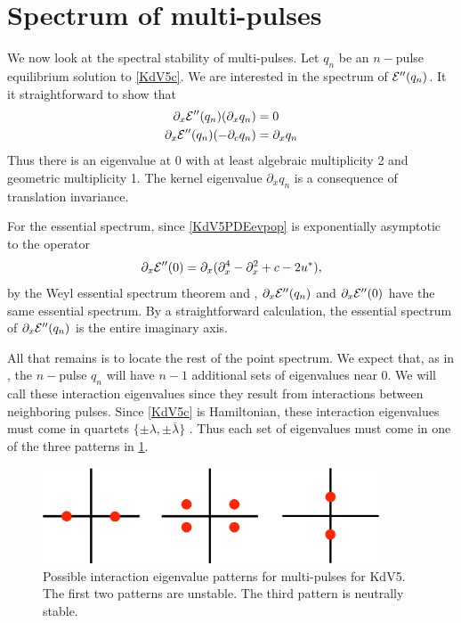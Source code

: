 \documentclass[thesis.tex]{subfiles}
\begin{document}
\section{Spectrum of multi-pulses}

We now look at the spectral stability of multi-pulses. Let $q_n$ be an $n-$pulse equilibrium solution to \cref{KdV5c}. We are interested in the spectrum of $\mathcal{E}''(q_n)$. It it straightforward to show that 
\begin{align*}
\partial_x \mathcal{E}''(q_n) (\partial_x q_n) &= 0 \\
\partial_x \mathcal{E}''(q_n) (-\partial_c q_n) &= \partial_x q_n
\end{align*}
Thus there is an eigenvalue at 0 with at least algebraic multiplicity 2 and geometric multiplicity 1. The kernel eigenvalue $\partial_x q_n$ is a consequence of translation invariance.

For the essential spectrum, since \cref{KdV5PDEevpop} is exponentially asymptotic to the operator 
\[
\partial_x \mathcal{E}''(0) = 
\partial_x(\partial_x^4 - \partial_x^2 + c - 2 u^*),
\]
by the Weyl essential spectrum theorem \cite[Theorem 2.2.6]{Kapitula2013} and \cite[Theorem 3.1.11]{Kapitula2013}, $\partial_x \mathcal{E}''(q_n)$ and $\partial_x \mathcal{E}''(0)$ have the same essential spectrum. By a straightforward calculation, the essential spectrum of $\partial_x \mathcal{E}''(q_n)$ is the entire imaginary axis.

All that remains is to locate the rest of the point spectrum. We expect that, as in \cite{Sandstede1998}, the $n-$pulse $q_n$ will have $n-1$ additional sets of eigenvalues near 0. We will call these interaction eigenvalues since they result from interactions between neighboring pulses. Since \cref{KdV5c} is Hamiltonian, these interaction eigenvalues must come in quartets $\{ \pm \lambda, \pm \overline{\lambda}\}$ \cite[Proposition 5.1.2]{Kapitula2013}. Thus each set of eigenvalues must come in one of the three patterns in \cref{fig:kdv5inteigpattern}.

\begin{figure}[H]
\includegraphics[width=10cm]{images/kdv5/eigdouble2}
\caption{Possible interaction eigenvalue patterns for multi-pulses for KdV5. The first two patterns are unstable. The third pattern is neutrally stable.}
\label{fig:kdv5inteigpattern}
\end{figure}
\end{document}
